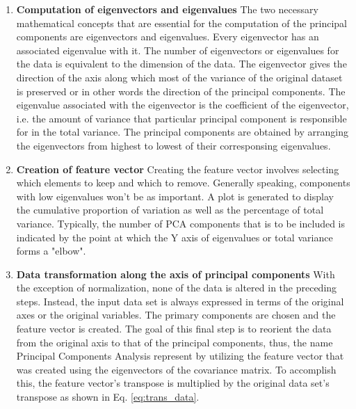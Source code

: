 \begin{enumerate}
\begin{equation}
\begin{bmatrix}
  \end{bmatrix}
\end{equation}
  The covariance matrix has all possible pairs of initial variables as entries and is a p × p symmetric matrix (where p is the number of dimensions).
  The variances of each starting variable are along the major diagonal (top left to bottom right), as the variance of a variable with itself is its covariance $(Cov(a,a)=Var(a))$. Furthermore, because the covariance is commutative $(Cov(a,b)=Cov(b,a))$, the covariance matrix's entries are symmetric with regard to the main diagonal, meaning that the top and lower triangular sections are equal. When two variables increase or decrease at the same time, i.e. they are correlated, then the value in the covariance matrix is positive. Whereas, if the two variables doesn't follow the same trend, i.e. one increases while the other decreases, then the variables are uncorrelated.\cite{abdi2010principal}
  \item \textbf{Computation of eigenvectors and eigenvalues} The two necessary mathematical concepts that are essential for the computation of the principal components are eigenvectors and eigenvalues. Every eigenvector has an associated eigenvalue with it. The number of eigenvectors or eigenvalues for the data is equivalent to the dimension of the data. The eigenvector gives the direction of the axis along which most of the variance of the original dataset is preserved or in other words the direction of the principal components. The eigenvalue associated with the eigenvector is the coefficient of the eigenvector, i.e. the amount of variance that particular principal component is responsible for in the total variance. The principal components are obtained by arranging the eigenvectors from highest to lowest of their corresponsing eigenvalues.\cite{abdi2010principal} 
  \item \textbf{Creation of feature vector} Creating the feature vector involves selecting which elements to keep and which to remove. Generally speaking, components with low eigenvalues won't be as important. A plot is generated to display the cumulative proportion of variation as well as the percentage of total variance. Typically, the number of PCA components that is to be included is indicated by the point at which the Y axis of eigenvalues or total variance forms a "elbow".\cite{abdi2010principal}
  \item \textbf{Data transformation along the axis of principal components} With the exception of normalization, none of the data is altered in the preceding steps. Instead, the input data set is always expressed in terms of the original axes or the original variables. The primary components are chosen and the feature vector is created. The goal of this final step is to reorient the data from the original axis to that of the principal components, thus, the name Principal Components Analysis represent by utilizing the feature vector that was created using the eigenvectors of the covariance matrix. To accomplish this, the feature vector's transpose is multiplied by the original data set's transpose as shown in Eq. \ref{eq:trans_data}.\cite{abdi2010principal}

\end{enumerate}
